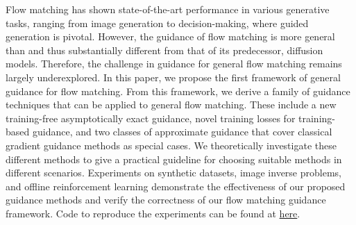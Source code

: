 
Flow matching has shown state-of-the-art performance in various generative tasks, ranging from image generation to decision-making, where guided generation is pivotal. However, the guidance of flow matching is more general than and thus substantially different from that of its predecessor, diffusion models. 
Therefore, the challenge in guidance for general flow matching remains largely underexplored.
In this paper, we propose the first framework of 
general guidance for flow matching. From this framework, we derive a family of guidance techniques that can be applied to general flow matching. These include a new training-free asymptotically exact guidance, novel training losses for training-based guidance, and two classes of approximate guidance that cover classical gradient guidance methods as special cases. We theoretically investigate these different methods to give a practical guideline for choosing suitable methods in different scenarios. Experiments on synthetic datasets, image inverse problems, and offline reinforcement learning demonstrate the effectiveness of our proposed guidance methods and verify the correctness of our flow matching guidance framework. Code to reproduce the experiments can be found at \href{https://github.com/AI4Science-WestlakeU/flow_guidance}{here}.
